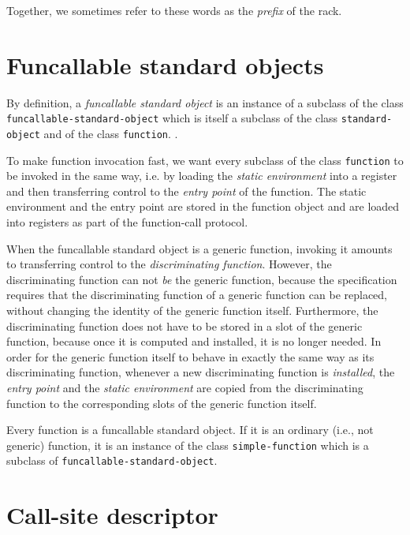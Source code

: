 Together, we sometimes refer to these words as the \emph{prefix} of
the rack.

\section{Funcallable standard objects}
\label{sec-data-representation-funcallable-standard-objects}

By definition, a \emph{funcallable standard object} is an instance of
a subclass of the class \texttt{funcallable-standard-object} which is
itself a subclass of the class \texttt{standard-object} and of the
class \texttt{function}. .

To make function invocation fast, we want every subclass of the class
\texttt{function} to be invoked in the same way, i.e. by loading the
\emph{static environment} into a register and then transferring
control to the \emph{entry point} of the function. The static
environment and the entry point are stored in the function object
and are loaded into registers as part of the function-call protocol.

When the funcallable standard object is a generic function, invoking
it amounts to transferring control to the \emph{discriminating
  function}.  However, the discriminating function can not \emph{be}
the generic function, because the \clos{} specification requires that
the discriminating function of a generic function can be replaced,
without changing the identity of the generic function itself.
Furthermore, the discriminating function does not have to be stored in
a slot of the generic function, because once it is computed and
installed, it is no longer needed.  In order for the generic function
itself to behave in exactly the same way as its discriminating
function, whenever a new discriminating function is \emph{installed},
the \emph{entry point} and the \emph{static environment} are copied
from the discriminating function to the corresponding slots of the
generic function itself.

Every \sysname{} function is a funcallable standard object.  If it is
an ordinary (i.e., not generic) function, it is an instance of the
class \texttt{simple-function} which is a subclass of
\texttt{funcallable-standard-object}.

\section{Call-site descriptor}
\label{sec-call-site-descriptor}

